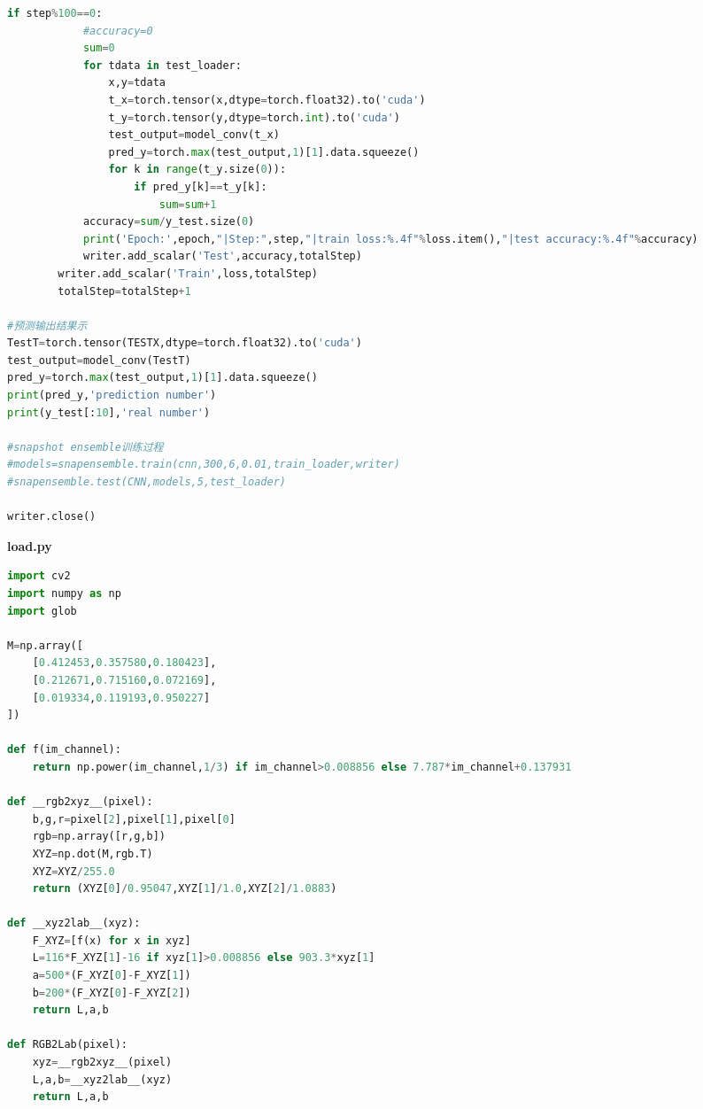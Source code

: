 \documentclass[supercite]{HustGraduPaper}
\begin{document}
\begin{sloppypar}
\begin{appendices}
\begin{spacing}{1.25}
\begin{lstlisting}[language=python]
        if step%100==0:
            #accuracy=0
            sum=0
            for tdata in test_loader:
                x,y=tdata
                t_x=torch.tensor(x,dtype=torch.float32).to('cuda')
                t_y=torch.tensor(y,dtype=torch.int).to('cuda')
                test_output=model_conv(t_x)
                pred_y=torch.max(test_output,1)[1].data.squeeze()
                for k in range(t_y.size(0)):
                    if pred_y[k]==t_y[k]:
                        sum=sum+1
            accuracy=sum/y_test.size(0)
            print('Epoch:',epoch,"|Step:",step,"|train loss:%.4f"%loss.item(),"|test accuracy:%.4f"%accuracy)
            writer.add_scalar('Test',accuracy,totalStep)
        writer.add_scalar('Train',loss,totalStep)
        totalStep=totalStep+1

#预测输出结果示
TestT=torch.tensor(TESTX,dtype=torch.float32).to('cuda')
test_output=model_conv(TestT)
pred_y=torch.max(test_output,1)[1].data.squeeze()
print(pred_y,'prediction number')
print(y_test[:10],'real number')

#snapshot ensemble训练过程
#models=snapensemble.train(cnn,300,6,0.01,train_loader,writer)
#snapensemble.test(CNN,models,5,test_loader)

writer.close()
  \end{lstlisting}
\end{spacing}
\textbf{load.py}
  \begin{spacing}{1.25}
  \begin{lstlisting}[language=python]
    import cv2
import numpy as np
import glob

M=np.array([
    [0.412453,0.357580,0.180423],
    [0.212671,0.715160,0.072169],
    [0.019334,0.119193,0.950227]
])

def f(im_channel):
    return np.power(im_channel,1/3) if im_channel>0.008856 else 7.787*im_channel+0.137931

def __rgb2xyz__(pixel):
    b,g,r=pixel[2],pixel[1],pixel[0]
    rgb=np.array([r,g,b])
    XYZ=np.dot(M,rgb.T)
    XYZ=XYZ/255.0
    return (XYZ[0]/0.95047,XYZ[1]/1.0,XYZ[2]/1.0883)

def __xyz2lab__(xyz):
    F_XYZ=[f(x) for x in xyz]
    L=116*F_XYZ[1]-16 if xyz[1]>0.008856 else 903.3*xyz[1]
    a=500*(F_XYZ[0]-F_XYZ[1])
    b=200*(F_XYZ[0]-F_XYZ[2])
    return L,a,b

def RGB2Lab(pixel):
    xyz=__rgb2xyz__(pixel)
    L,a,b=__xyz2lab__(xyz)
    return L,a,b


\end{lstlisting}
\end{spacing}
\end{appendices}
\end{sloppypar}
\end{document}
